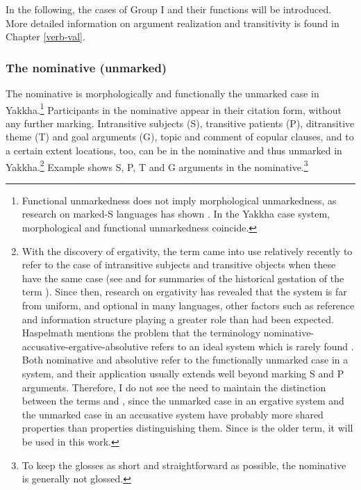 In the following, the cases of Group I and their functions will be introduced. More detailed information on argument realization and transitivity is found in Chapter \ref{verb-val}.

\subsubsection{The nominative (unmarked)}\label{case-nom}

The nominative is  morphologically and functionally the unmarked case in Yakkha.\footnote{Functional unmarkedness does not imply morphological unmarkedness, as research on marked-S languages has shown \citep{Handschuh2011_thesis, Brown2001_Nias}. In the Yakkha case system, morphological and functional unmarkedness coincide.} Participants in the nominative appear in their citation form, without any further marking. Intransitive subjects (S), transitive patients (P), ditransitive theme  (T) and goal arguments  (G), topic and comment of copular clauses, and to a certain extent locations, too, can be in the nominative and thus unmarked in Yakkha.\footnote{With the discovery of ergativity, the term  came into use relatively recently to refer to the case of intransitive subjects and transitive objects when these have the same case (see \citet{McGregor2009_Ergativity} and \citet{Haspelmath2009_Terminology} for summaries of the historical gestation of the term ). Since then, research on ergativity has revealed that the system is far from uniform, and optional in many languages, other factors such as reference and information structure playing a greater role than had been expected. Haspelmath mentions the problem that the terminology nominative-accusative-ergative-absolutive refers to an ideal system which is rarely found \citep[513]{Haspelmath2009_Terminology}. Both nominative and absolutive refer to the functionally unmarked case in a system, and their application usually extends well beyond marking S and P arguments. Therefore, I do not see the need to maintain the distinction between the terms  and , since the unmarked case in an ergative system and the unmarked case in an accusative system have probably more shared properties than properties distinguishing them. Since  is the older term, it will be used in this work.} Example  \Next shows S, P, T and G arguments in the nominative.\footnote{To keep the glosses as short and straightforward as possible, the nominative is generally not glossed.} 


